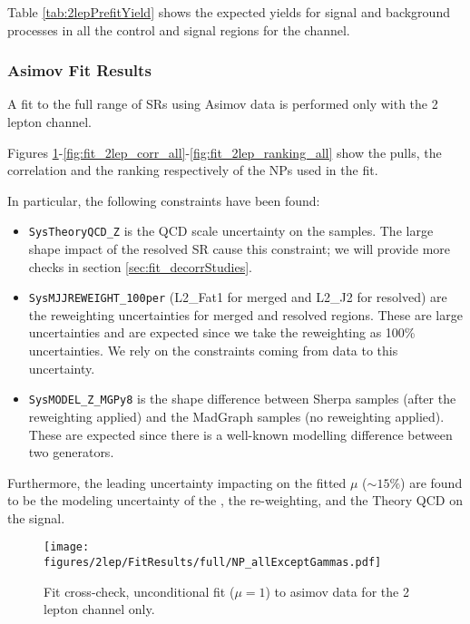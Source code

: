 Table \ref{tab:2lepPrefitYield} shows the expected yields for signal and background processes 
in all the control and signal regions for the \tlep channel.



\clearpage

\subsubsection{Asimov Fit Results}
A fit to the full range of SRs using Asimov data is performed only with the 2 lepton channel.

Figures \ref{fig:fit_2lep_fcc_asimov}-\ref{fig:fit_2lep_corr_all}-\ref{fig:fit_2lep_ranking_all}
show the pulls, the correlation and the ranking respectively of the NPs used in the fit.

In particular, the following constraints have been found:

\begin{itemize}
       \item \texttt{SysTheoryQCD\_Z} is the QCD scale uncertainty on the \Zjets samples. 
       The large shape impact of the resolved SR cause this constraint;
       we will provide more checks in section \ref{sec:fit_decorrStudies}.
       
       \item \texttt{SysMJJREWEIGHT\_100per} (L2\_Fat1 for merged and L2\_J2 for resolved) 
       are the \mjjtag reweighting uncertainties for merged and resolved regions.
       These are large uncertainties and are expected since we take the \mjjtag reweighting as 100\% uncertainties.
       We rely on the constraints coming from data to this uncertainty.

       \item \texttt{SysMODEL\_Z\_MGPy8}
       is the shape difference between Sherpa \Zjets samples (after the \mjjtag reweighting applied) 
       and the MadGraph \Zjets samples (no \mjjtag reweighting applied).
       These are expected since there is a well-known modelling difference between two generators.

\end{itemize}

Furthermore, the leading uncertainty impacting on the fitted $\mu$ ($\sim 15\%$) 
are found to be 
the modeling uncertainty of the \Vjets,
the \mjjtag re-weighting,
and the Theory QCD on the signal.

\begin{figure}[ht]
      \centering
        \texttt{[image: figures/2lep/FitResults/full/NP\_allExceptGammas.pdf]}
        \caption{Fit cross-check, unconditional fit ($\mu=1$) to asimov data for the 2 lepton channel only.}
       \label{fig:fit_2lep_fcc_asimov}
\end{figure}

